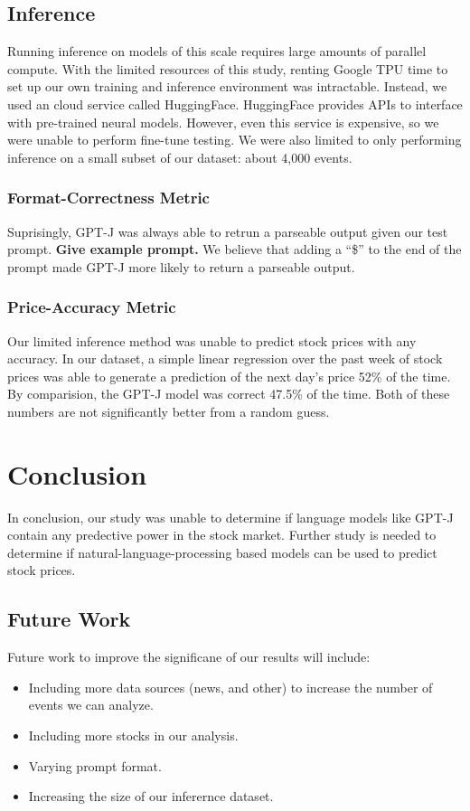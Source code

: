 \documentclass[conference]{IEEEtran}
\begin{document}
\subsection{Inference}
Running inference on models of this scale requires large amounts of parallel compute. With the limited resources of this study, renting Google TPU time to set up our own training and inference environment was intractable. Instead, we used an cloud service called HuggingFace. HuggingFace provides APIs to interface with pre-trained neural models. However, even this service is expensive, so we were unable to perform fine-tune testing. We were also limited to only performing inference on a small subset of our dataset: about 4,000 events.
\subsubsection{Format-Correctness Metric}
Suprisingly, GPT-J was always able to retrun a parseable output given our test prompt. \textbf{Give example prompt.} We believe that adding a ``\$'' to the end of the prompt made GPT-J more likely to return a parseable output.
\subsubsection{Price-Accuracy Metric}
Our limited inference method was unable to predict stock prices with any accuracy. In our dataset, a simple linear regression over the past week of stock prices was able to generate a prediction of the next day's price 52\% of the time. By comparision, the GPT-J model was correct 47.5\% of the time. Both of these numbers are not significantly better from a random guess. 
\section{Conclusion}
In conclusion, our study was unable to determine if language models like GPT-J contain any predective power in the stock market. Further study is needed to determine if natural-language-processing based models can be used to predict stock prices.
\subsection{Future Work}
Future work to improve the significane of our results will include:
\begin{itemize}
	\item Including more data sources (news, and other) to increase the number of events we can analyze.
	\item Including more stocks in our analysis.
	\item Varying prompt format.
	\item Increasing the size of our inferernce dataset.
\end{itemize}





\end{document}
